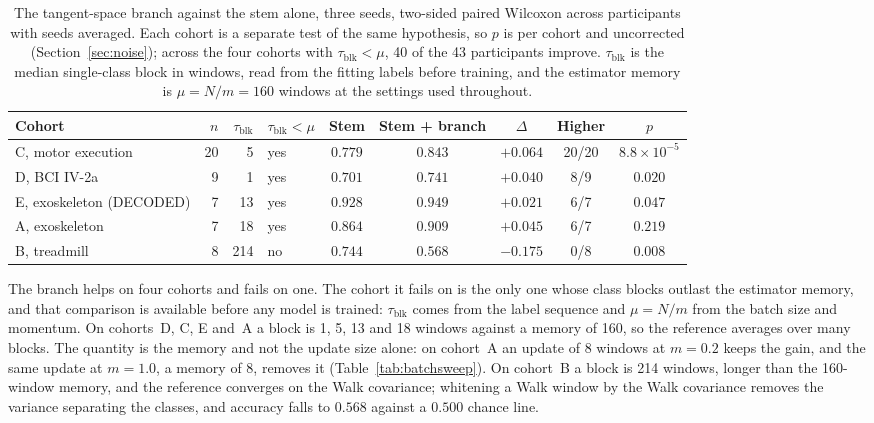 \documentclass[a4paper,fleqn]{cas-dc}
\begin{document}
\begin{table}[t]
\centering
\caption{The tangent-space branch against the stem alone, three seeds, two-sided paired Wilcoxon across participants with seeds averaged. Each cohort is a separate test of the same hypothesis, so $p$ is per cohort and uncorrected (Section~\ref{sec:noise}); across the four cohorts with $\tau_{\mathrm{blk}}<\mu$, 40 of the 43 participants improve. $\tau_{\mathrm{blk}}$ is the median single-class block in windows, read from the fitting labels before training, and the estimator memory is $\mu = N/m = 160$ windows at the settings used throughout.}
\label{tab:five}
\begin{tabular}{lrrlccccc}
\hline
Cohort & $n$ & $\tau_{\mathrm{blk}}$ & $\tau_{\mathrm{blk}}<\mu$ & Stem & Stem + branch & $\Delta$ & Higher & $p$ \\
\hline
C, motor execution & 20 & 5 & yes & $0.779$ & $0.843$ & $+0.064$ & 20/20 & $8.8\times10^{-5}$ \\
D, BCI IV-2a & 9 & 1 & yes & $0.701$ & $0.741$ & $+0.040$ & 8/9 & $0.020$ \\
E, exoskeleton (DECODED) & 7 & 13 & yes & $0.928$ & $0.949$ & $+0.021$ & 6/7 & $0.047$ \\
A, exoskeleton & 7 & 18 & yes & $0.864$ & $0.909$ & $+0.045$ & 6/7 & $0.219$ \\
B, treadmill & 8 & 214 & no & $0.744$ & $0.568$ & $-0.175$ & 0/8 & $0.008$ \\
\hline
\end{tabular}
\end{table}

The branch helps on four cohorts and fails on one. The cohort it fails on is the only one whose class blocks outlast the estimator memory, and that comparison is available before any model is trained: $\tau_{\mathrm{blk}}$ comes from the label sequence and $\mu=N/m$ from the batch size and momentum. On cohorts~D, C, E and~A a block is 1, 5, 13 and 18 windows against a memory of 160, so the reference averages over many blocks. The quantity is the memory and not the update size alone: on cohort~A an update of 8 windows at $m=0.2$ keeps the gain, and the same update at $m=1.0$, a memory of 8, removes it (Table~\ref{tab:batchsweep}). On cohort~B a block is 214 windows, longer than the 160-window memory, and the reference converges on the Walk covariance; whitening a Walk window by the Walk covariance removes the variance separating the classes, and accuracy falls to $0.568$ against a $0.500$ chance line.
\end{document}
